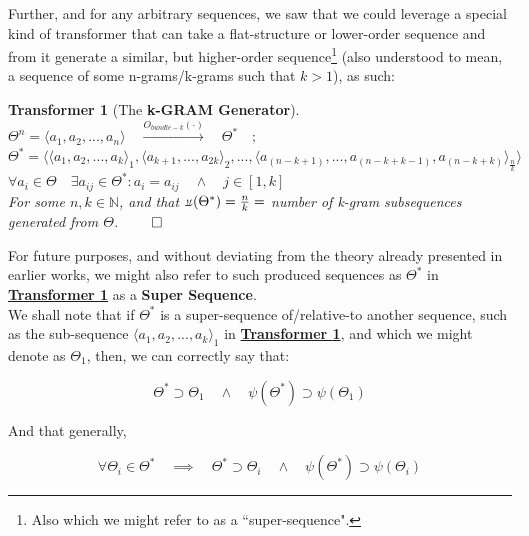 \documentclass[a4paper, 18pt]{book} %
\newtheorem{transf}{Transformer}
\newcommand{\invpi}{\rotatebox[origin=c]{180}{$\pi$}}
\begin{document}
Further, and for any arbitrary sequences, we saw that we could leverage a special kind of transformer that can take a flat-structure or lower-order sequence and from it generate a similar, but higher-order sequence\footnote{Also which we might refer to as a ``super-sequence".} (also understood to mean, a sequence of some n-grams/k-grams such that $k > 1$), as such:

\vspace{1em}
\begin{transf}[The \textbf{k-GRAM Generator}]
\label{TRANSFBUNDb}
$\Theta^n = \langle a_1, a_2,...,a_n\rangle \quad \xrightarrow{O_{bundle-k}(\cdot)} \quad \Theta^* \quad;$\\
$\Theta^* = \langle \langle a_1, a_2,..., a_k \rangle_1, \langle a_{k+1},...,a_{2k} \rangle_2,... , \langle a_{(n-k+1)},...,a_{(n-k+k-1)},a_{(n-k+k)}\rangle_{\frac{n}{k}} \rangle$\\
$\forall a_i \in \Theta \quad \exists a_{ij} \in \Theta^*: a_i = a_{ij} \quad \land \quad j \in [1,k]$\\
For some $n, k \in \mathbb{N}$, and that $\invpi(\Theta^*) = \frac{n}{k} = $ number of k-gram subsequences generated from $\Theta$. $\qed$
\end{transf}
\vspace{1em}

For future purposes, and without deviating from the theory already presented in earlier works, we might also refer to such produced sequences as $\Theta^*$ in \textbf{\hyperref[TRANSFBUNDb]{Transformer \ref{TRANSFBUNDb}}} as a \textbf{Super Sequence}.\\

We shall note that if $\Theta^*$ is a super-sequence of/relative-to another sequence, such as the sub-sequence $\langle a_1, a_2,..., a_k \rangle_1$ in \textbf{\hyperref[TRANSFBUNDb]{Transformer \ref{TRANSFBUNDb}}}, and which we might denote as $\Theta_1$, then, we can correctly say that:

\vspace{1em}
\begin{equation}
\Theta^* \supset \Theta_1 \quad \land \quad \psi(\Theta^*) \supset \psi(\Theta_1)
\end{equation}
\vspace{1em}

And that generally,

\vspace{1em}
\begin{equation}
\forall \Theta_i \in \Theta^* \quad \implies \quad \Theta^* \supset \Theta_i \quad \land \quad \psi(\Theta^*) \supset \psi(\Theta_i)
\end{equation}
\vspace{1em}
\end{document}
